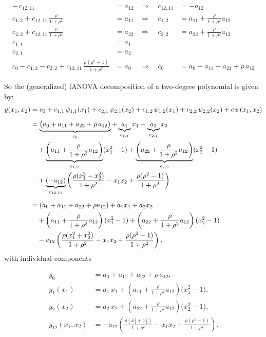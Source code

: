 \begin{align*}
-\,c_{12, 11} &= a_{12} &\Rightarrow\quad c_{12, 11} &= -a_{12} \\[3pt]
c_{1,2} + c_{12, 11}\,\tfrac{\rho}{1+\rho^2} &= a_{11} 
&\Rightarrow\quad c_{1,2} &= a_{11} + \tfrac{\rho}{1+\rho^2}a_{12} \\[3pt]
c_{2,2} + c_{12, 11}\,\tfrac{\rho}{1+\rho^2} &= a_{22} 
&\Rightarrow\quad c_{2,2} &= a_{22} + \tfrac{\rho}{1+\rho^2}a_{12} \\[3pt]
c_{1,1} &= a_1 \\[3pt]
c_{2,1} &= a_2 \\[3pt]
c_0 - c_{1,2} - c_{2,2} + c_{12, 11}\,\tfrac{\rho(\rho^2 - 1)}{1+\rho^2} &= a_0 
&\Rightarrow\quad 
c_0 &= a_0 + a_{11} + a_{22} + \rho\,a_{12}
\end{align*}

So the (generalized) fANOVA decomposition of a two-degree polynomial is given by:
\begin{align*}
y(x_1,x_2) 
&= c_0 
  + c_{1,1}\,\psi_{1,1}(x_1) 
  + c_{2,1}\,\psi_{2,1}(x_2)
  + c_{1,2}\,\psi_{1,2}(x_1)
  + c_{2,2}\,\psi_{2,2}(x_2)
  + c\,\psi(x_1,x_2) \\[5pt]
&= 
\underbrace{\big(a_0 + a_{11} + a_{22} + \rho\,a_{12}\big)}_{c_0} 
+ \underbrace{a_1}_{c_{1,1}} x_1
+ \underbrace{a_2}_{c_{2,1}} x_2 \\ 
&\quad 
+ \underbrace{\left(a_{11} + \frac{\rho}{1+\rho^2}a_{12}\right)}_{c_{1,2}} (x_1^2 - 1)
+ \underbrace{\left(a_{22} + \frac{\rho}{1+\rho^2}a_{12}\right)}_{c_{2,2}} (x_2^2 - 1) \notag \\
&\quad 
+ \underbrace{(-a_{12})}_{c_{12, 11}}\left(
    \frac{\rho(x_1^2+x_2^2)}{1+\rho^2} - x_1 x_2 
    + \frac{\rho(\rho^2-1)}{1+\rho^2}
  \right) \\[5pt]
&= 
(a_0 + a_{11} + a_{22} + \rho a_{12})
+ a_1 x_1
+ a_2 x_2 \notag \\ 
&\quad 
+ \left(a_{11} + \frac{\rho}{1+\rho^2} a_{12}\right)(x_1^2 - 1)
+ \left(a_{22} + \frac{\rho}{1+\rho^2} a_{12}\right)(x_2^2 - 1) \notag \\
&\quad 
- a_{12}\left(
  \frac{\rho(x_1^2 + x_2^2)}{1+\rho^2}
  - x_1 x_2
  + \frac{\rho(\rho^2 - 1)}{1+\rho^2}
  \right),
\end{align*}
with individual components

\begin{align*}
y_0 &= a_0 + a_{11} + a_{22} + \rho\,a_{12}, \\[3pt]
y_1(x_1) &= a_1\,x_1 
  + \left(a_{11} + \frac{\rho}{1+\rho^2}a_{12}\right)\bigl(x_1^2 - 1\bigr), \\[3pt]
y_2(x_2) &= a_2\,x_2 
  + \left(a_{22} + \frac{\rho}{1+\rho^2}a_{12}\right)\bigl(x_2^2 - 1\bigr), \\[3pt]
y_{12}(x_1,x_2) 
&= -a_{12}\!\left(
    \frac{\rho(x_1^2+x_2^2)}{1+\rho^2} 
    - x_1 x_2 
    + \frac{\rho(\rho^2-1)}{1+\rho^2}
   \right).
\end{align*}


